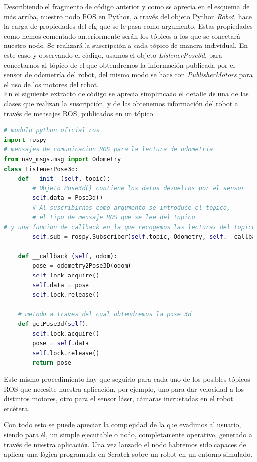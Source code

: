 Describiendo el fragmento de código anterior y como se aprecia en el esquema de más arriba, nuestro nodo ROS en Python, a través del objeto Python \textit{Robot}, hace la carga de propiedades del cfg que se le pasa como argumento. Estas propiedades como hemos comentado anteriormente serán los tópicos a los que se conectará nuestro nodo. Se realizará la suscripción a cada tópico de manera individual. En este caso y observando el código,  usamos el objeto \textit{ListenerPose3d}, para conectarnos al tópico de el que obtendremos la información publicada por el sensor de odometría del robot, del mismo modo se hace con \textit{PublisherMotors} para el uso de los motores del robot.\\

En el siguiente extracto de código se aprecia simplificado el detalle de una de las clases que realizan la suscripción, y de las obtenemos información del robot a través de mensajes ROS, publicados en un tópico.

\begin{lstlisting}[language=python,firstnumber=1]
# modulo python oficial ros
import rospy
# mensajes de comunicacion ROS para la lectura de odometria
from nav_msgs.msg import Odometry
class ListenerPose3d:
    def __init__(self, topic):
    	# Objeto Pose3d() contiene los datos devueltos por el sensor
        self.data = Pose3d() 
        # Al suscribirnos como argumento se introduce el topico,
        # el tipo de mensaje ROS que se lee del topico
# y una funcion de callback en la que recogemos las lecturas del topico
        self.sub = rospy.Subscriber(self.topic, Odometry, self.__callback)

    def __callback (self, odom):
        pose = odometry2Pose3D(odom)
        self.lock.acquire()
        self.data = pose
        self.lock.release()
        
    # metodo a traves del cual obtendremos la pose 3d    
    def getPose3d(self):
        self.lock.acquire()
        pose = self.data
        self.lock.release()
        return pose
\end{lstlisting}

Este mismo procedimiento hay que seguirlo para cada uno de los posibles tópicos ROS que necesite nuestra aplicación, por ejemplo, uno para dar velocidad a los distintos motores, otro para el sensor láser, cámaras incrustadas en el robot etcétera.

Con todo esto se puede apreciar la complejidad de la que evadimos al usuario, siendo para él, un simple ejecutable o nodo, completamente operativo, generado a través de nuestra aplicación. Una vez lanzado el nodo habremos sido capaces de aplicar una lógica programada en Scratch sobre un robot en un entorno simulado. 


